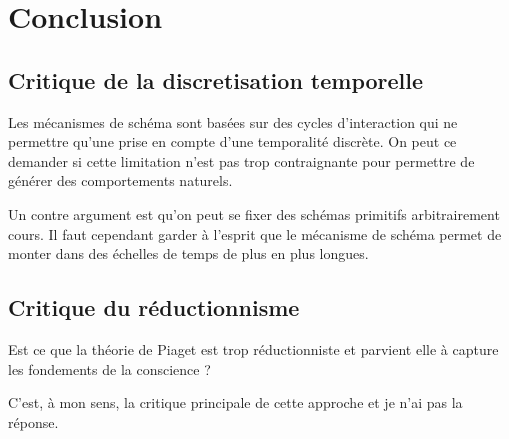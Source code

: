 \chapter{Conclusion}



\section{Critique de la discretisation temporelle}

Les mécanismes de schéma sont basées sur des cycles d'interaction qui ne permettre qu'une prise en compte d'une temporalité discrète. 
On peut ce demander si cette limitation n'est pas trop contraignante pour permettre de générer des comportements naturels. 

Un contre argument est qu'on peut se fixer des schémas primitifs arbitrairement cours. 
Il faut cependant garder à l'esprit que le mécanisme de schéma permet de monter dans des échelles de temps de plus en plus longues. 




\section{Critique du réductionnisme}

Est ce que la théorie de Piaget est trop réductionniste et parvient elle à capture les fondements de la conscience ? 

C'est, à mon sens, la critique principale de cette approche et je n'ai pas la réponse. 